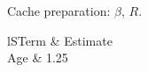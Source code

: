 \documentclass{article}
\begin{document}
Cache preparation: $\hat\beta$, $R$.
\begin{tabular}{lS}\toprule Term & {Estimate}\\\midrule Age & 1.25\\\bottomrule\end{tabular}
\end{document}
